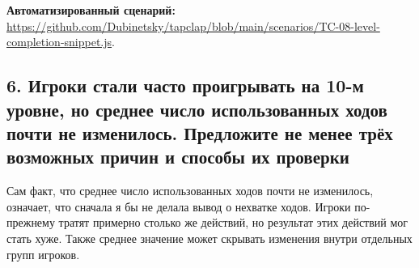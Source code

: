 \documentclass{ZGJournalArticle_2026}
\begin{document}
\textbf{Автоматизированный сценарий:}
\href{../scenarios/TC-08-level-completion-snippet.js}{https://github.com/Dubinetsky/tapclap/blob/main/scenarios/TC-08-level-completion-snippet.js}.

\newpage

\subsection{6. Игроки стали часто проигрывать на 10-м уровне, но среднее
число использованных ходов почти не изменилось. Предложите не менее трёх
возможных причин и способы их
проверки}\label{ux438ux433ux440ux43eux43aux438-ux441ux442ux430ux43bux438-ux447ux430ux441ux442ux43e-ux43fux440ux43eux438ux433ux440ux44bux432ux430ux442ux44c-ux43dux430-10-ux43c-ux443ux440ux43eux432ux43dux435-ux43dux43e-ux441ux440ux435ux434ux43dux435ux435-ux447ux438ux441ux43bux43e-ux438ux441ux43fux43eux43bux44cux437ux43eux432ux430ux43dux43dux44bux445-ux445ux43eux434ux43eux432-ux43fux43eux447ux442ux438-ux43dux435-ux438ux437ux43cux435ux43dux438ux43bux43eux441ux44c.-ux43fux440ux435ux434ux43bux43eux436ux438ux442ux435-ux43dux435-ux43cux435ux43dux435ux435-ux442ux440ux451ux445-ux432ux43eux437ux43cux43eux436ux43dux44bux445-ux43fux440ux438ux447ux438ux43d-ux438-ux441ux43fux43eux441ux43eux431ux44b-ux438ux445-ux43fux440ux43eux432ux435ux440ux43aux438}

Сам факт, что среднее число использованных ходов почти не изменилось,
означает, что сначала я бы не делала вывод о нехватке ходов. Игроки
по-прежнему тратят примерно столько же действий, но результат этих
действий мог стать хуже. Также среднее значение может скрывать изменения
внутри отдельных групп игроков.
\end{document}
